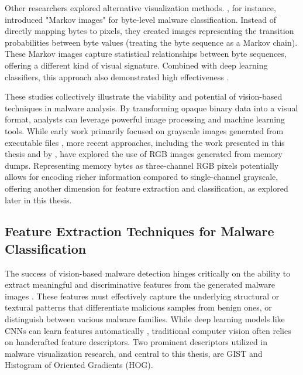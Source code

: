 Other researchers explored alternative visualization methods. \citet{yuan2020byte}, for instance, introduced "Markov images" for byte-level malware classification. Instead of directly mapping bytes to pixels, they created images representing the transition probabilities between byte values (treating the byte sequence as a Markov chain). These Markov images capture statistical relationships between byte sequences, offering a different kind of visual signature. Combined with deep learning classifiers, this approach also demonstrated high effectiveness \citep{yuan2020byte}.

These studies collectively illustrate the viability and potential of vision-based techniques in malware analysis. By transforming opaque binary data into a visual format, analysts can leverage powerful image processing and machine learning tools. While early work primarily focused on grayscale images generated from executable files \citep{nataraj2011malware, dai2018malware}, more recent approaches, including the work presented in this thesis and by \citet{bozkir2021catch}, have explored the use of RGB images generated from memory dumps. Representing memory bytes as three-channel RGB pixels potentially allows for encoding richer information compared to single-channel grayscale, offering another dimension for feature extraction and classification, as explored later in this thesis.


\subsection{Feature Extraction Techniques for Malware Classification}
\label{subsec:feature_extraction}

The success of vision-based malware detection hinges critically on the ability to extract meaningful and discriminative features from the generated malware images \citep{gibert2020rise}. These features must effectively capture the underlying structural or textural patterns that differentiate malicious samples from benign ones, or distinguish between various malware families. While deep learning models like CNNs can learn features automatically \citep{zhang2023malware, vasan2020image}, traditional computer vision often relies on handcrafted feature descriptors. Two prominent descriptors utilized in malware visualization research, and central to this thesis, are GIST and Histogram of Oriented Gradients (HOG).

